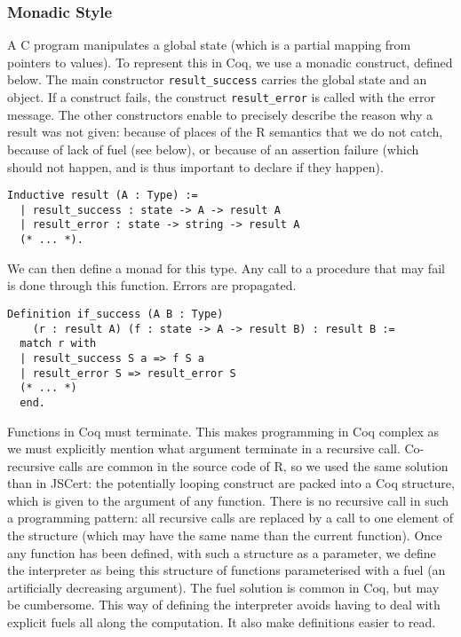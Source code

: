 \documentclass{article}
\newcommand\Coq{Coq}
\newcommand\R{R}
\newcommand\Cn{C}
\begin{document}
\subsubsection{Monadic Style}
\label{sec:monadic:style}

A \Cn{} program manipulates a global state
(which is a partial mapping from pointers to values).
To represent this in \Coq{}, we use a monadic construct, defined below.
The main constructor \texttt{result_success}
carries the global state and an object.
If a construct fails,
the construct \texttt{result_error}
is called with the error message.
The other constructors enable to precisely describe
the reason why a result was not given:
because of places of the \R{} semantics that we do not catch,
because of lack of fuel (see below),
or because of an assertion failure
(which should not happen,
and is thus important to declare if they happen).
\begin{verbatim}
Inductive result (A : Type) :=
  | result_success : state -> A -> result A
  | result_error : state -> string -> result A
  (* ... *).
\end{verbatim}

We can then define a monad for this type.
Any call to a procedure that may fail
is done through this function.
Errors are propagated.
\begin{verbatim}
Definition if_success (A B : Type)
    (r : result A) (f : state -> A -> result B) : result B :=
  match r with
  | result_success S a => f S a
  | result_error S => result_error S
  (* ... *)
  end.
\end{verbatim}
\todo{Added notation to have a readable \Coq{} program.}

Functions in \Coq{} must terminate.
This makes programming in \Coq{} complex as we must explicitly
mention what argument terminate in a recursive call.
Co-recursive calls are common in the source code of \R{},
so we used the same solution than in JSCert:
the potentially looping construct are packed into a \Coq{}
structure, which is given to the argument of any function.
There is no recursive call in such a programming pattern:
all recursive calls are replaced by a call to one element
of the structure (which may have the same name than the
current function).
Once any function has been defined,
with such a structure as a parameter,
we define the interpreter as being this structure of functions
parameterised with a fuel (an artificially decreasing argument).
The fuel solution is common in \Coq{},
but may be cumbersome.
This way of defining the interpreter avoids
having to deal with explicit fuels all along the computation.
It also make definitions easier to read.
\end{document}
